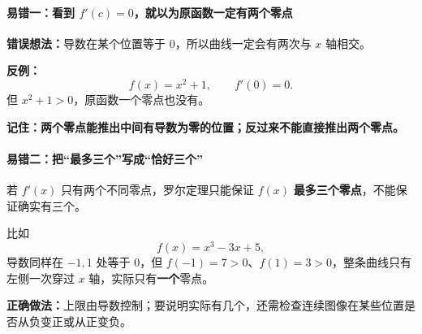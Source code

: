 \clearpage
\begin{trapbox}
\par\medskip
\noindent\begin{minipage}{\linewidth}
\paragraph{易错一：看到 $f'(c)=0$，就以为原函数一定有两个零点}
\begin{center}\end{center}
\end{minipage}\par\medskip

\textbf{错误想法：}导数在某个位置等于 $0$，所以曲线一定会有两次与 $x$ 轴相交。

\textbf{反例：}
\[
f(x)=x^2+1,\qquad f'(0)=0.
\]
但 $x^2+1>0$，原函数一个零点也没有。

\textbf{记住：}\textbf{两个零点能推出中间有导数为零的位置；反过来不能直接推出两个零点。}

\end{trapbox}
\clearpage
\begin{trapbox}
\par\medskip
\noindent\begin{minipage}{\linewidth}
\paragraph{易错二：把“最多三个”写成“恰好三个”}
\begin{center}\end{center}
\end{minipage}\par\medskip

若 $f'(x)$ 只有两个不同零点，罗尔定理只能保证 $f(x)$ \textbf{最多三个零点}，不能保证确实有三个。

比如
\[
f(x)=x^3-3x+5,
\]
导数同样在 $-1,1$ 处等于 $0$，但 $f(-1)=7>0$、$f(1)=3>0$，整条曲线只有左侧一次穿过 $x$ 轴，实际只有\textbf{一个}零点。

\textbf{正确做法：}上限由导数控制；要说明实际有几个，还需检查连续图像在某些位置是否从负变正或从正变负。

\end{trapbox}
\clearpage
